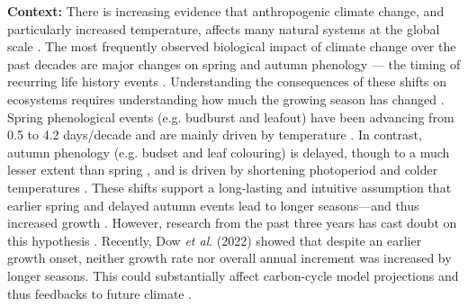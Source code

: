 \documentclass[12pt]{article}
\begin{document}
\textbf{Context:} There is increasing evidence that anthropogenic climate change, and particularly increased temperature, affects many natural systems at the global scale \cite{parmesan_poleward_1999,rosenzweig_attributing_2008}. The most frequently observed biological impact of climate change over the past decades are major changes on spring and autumn phenology --- the timing of recurring life history events \cite{parmesan_globally_2003,cleland_shifting_2007,lieth_phenology_1974,woolway_phenological_2021,menzel_european_2006}. Understanding the consequences of these shifts on ecosystems requires understanding how much the growing season has changed \cite{duputie_phenological_2015}. Spring phenological events (e.g. budburst and leafout) have been advancing from 0.5 \cite{wolfe_climate_2005} to 4.2 days/decade \cite{chmielewski_response_2001,fu_recent_2014} and are mainly driven by temperature \cite{chuine_why_2010,cleland_shifting_2007,penuelas_responses_2001}. In contrast, autumn phenology (e.g. budset and leaf colouring) is delayed, though to a much lesser extent than spring \cite{gallinat_autumn_2015,jeong_macroscale_2014}, and is driven by shortening photoperiod \cite{cooke_dynamic_2012,flynn_temperature_2018,korner_phenology_2010} and colder temperatures \cite{cooke_dynamic_2012,delpierre_temperate_2016}. These shifts support a long-lasting and intuitive assumption that earlier spring and delayed autumn events lead to longer seasons---and thus increased growth \cite{keenan_net_2014}. However, research from the past three years has cast doubt on this hypothesis \cite{dow_warm_2022,green_limits_2022,silvestro_longer_2023}. Recently, Dow \textit{et al}. (2022) showed that despite an earlier growth onset, neither growth rate nor overall annual increment was increased by longer seasons. This could substantially affect carbon-cycle model projections and thus feedbacks to future climate \cite{richardson_climate_2013,swidrak_comparing_2013}. 
\end{document}
